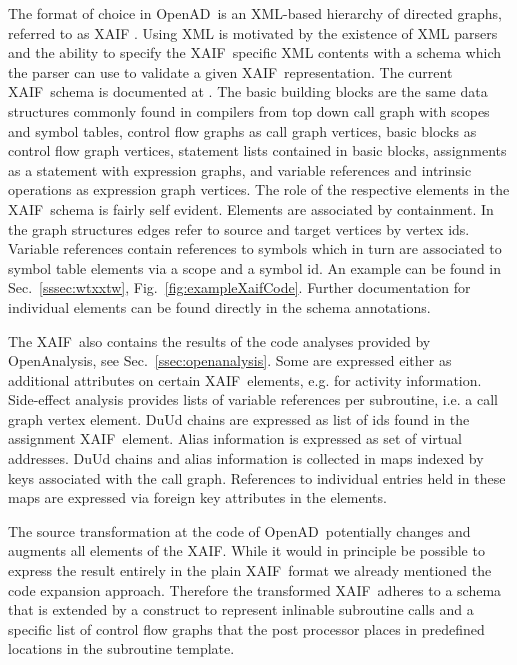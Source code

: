 \documentclass{book}
\newcommand{\OpenAD}{OpenAD}
\newcommand{\OpenAnalysis}{OpenAnalysis}
\newcommand{\xaif}{XAIF}
\newcommand{\refsec}[1]{{Sec.~\ref{#1}}}
\newcommand{\reffig}[1]{{Fig.~\ref{#1}}}
\begin{document}
The format of choice in \OpenAD\ is an XML-based \cite{xmlWeb} hierarchy of 
directed graphs, referred to as \xaif 
\cite{HNN02}. Using XML is motivated by the existence of XML parsers and 
the ability to specify the \xaif\ specific XML contents with a schema which 
the parser can use to validate a given \xaif\ representation. 
The current \xaif\ schema is documented at \cite{xaifweb}.
The basic building blocks are the same data structures commonly found 
in compilers from top down call graph with scopes and symbol tables, 
control flow graphs as call graph vertices, basic blocks  as control flow 
graph vertices, statement lists contained in basic blocks, 
assignments as a statement with expression graphs,  and variable references 
and intrinsic operations as expression graph vertices. 
The role of the respective elements in the \xaif\ schema is fairly self evident. 
Elements are associated by containment. In the graph structures edges 
refer to source and target vertices by vertex ids. 
Variable references contain references to symbols which in turn 
are associated to symbol table elements via a scope and a symbol id. 
An example can be found in \refsec{sssec:wtxxtw}, \reffig{fig:exampleXaifCode}.
Further documentation for individual elements can be found directly in the 
schema annotations. 

The \xaif\ also contains the results of the code analyses provided 
by \OpenAnalysis, see \refsec{ssec:openanalysis}. Some are expressed 
either as additional attributes on certain \xaif\ elements, e.g. for activity information. 
Side-effect analysis provides lists of variable references per subroutine, i.e. a call graph vertex element.
DuUd chains are expressed as list of ids found in the assignment \xaif\ element.
Alias information is expressed as set of virtual addresses. 
DuUd chains and alias information is collected in maps indexed by keys associated with the call 
graph. References to individual entries held in these maps are expressed via foreign key 
attributes in the elements. 

The source transformation at the code of \OpenAD\ potentially changes and augments 
all elements of the \xaif. While it would in principle be possible  
to express the result entirely in the plain \xaif\ format we already mentioned the 
code expansion approach. Therefore the transformed \xaif\ adheres to a schema 
that is extended by a construct to represent inlinable subroutine calls and 
a specific list of control flow graphs that the post processor places in predefined 
locations in the subroutine template.    
\end{document}
